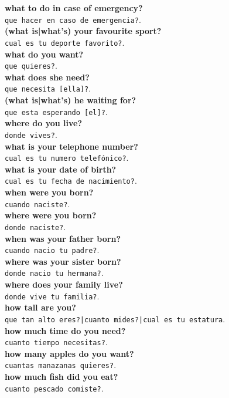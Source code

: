 \documentclass[twocolumn]{article}
\begin{document}
  \textbf{what to do in case of emergency?}\\\texttt{que hacer en caso de emergencia?}.\\
  \textbf{(what is|what's) your favourite sport?}\\\texttt{cual es tu deporte favorito?}.\\
  \textbf{what do you want?}\\\texttt{que quieres?}.\\
  \textbf{what does she need?}\\\texttt{que necesita [ella]?}.\\
  \textbf{(what is|what's) he waiting for?}\\\texttt{que esta esperando [el]?}.\\
  \textbf{where do you live?}\\\texttt{donde vives?}.\\
  \textbf{what is your telephone number?}\\\texttt{cual es tu numero telef\'onico?}.\\
  \textbf{what is your date of birth?}\\\texttt{cual es tu fecha de nacimiento?}.\\
  \textbf{when were you born?}\\\texttt{cuando naciste?}.\\
  \textbf{where were you born?}\\\texttt{donde naciste?}.\\
  \textbf{when was your father born?}\\\texttt{cuando nacio tu padre?}.\\
  \textbf{where was your sister born?}\\\texttt{donde nacio tu hermana?}.\\
  \textbf{where does your family live?}\\\texttt{donde vive tu familia?}.\\
  \textbf{how tall are you?}\\\texttt{que tan alto eres?|cuanto mides?|cual es tu estatura}.\\
  \textbf{how much time do you need?}\\\texttt{cuanto tiempo necesitas?}.\\
  \textbf{how many apples do you want?}\\\texttt{cuantas manazanas quieres?}.\\
  \textbf{how much fish did you eat?}\\\texttt{cuanto pescado comiste?}.\\
\end{document}
